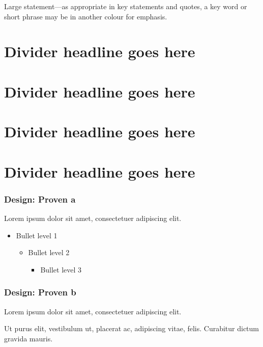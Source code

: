 \documentclass{ltx-talk-au}
\begin{document}
\begin{frame}[design=statement]
  Large statement—as appropriate in key statements and quotes, a key word or
  short phrase may be in another colour for \alert{emphasis}.
\end{frame}

\section{Divider headline goes here}

\section[theme=darkblue]{Divider headline goes here}

\section[theme=limestone]{Divider headline goes here}

\section[theme=purple]{Divider headline goes here}

\begin{frame}[design=proven a, theme=limestone]
  \frametitle{Design: Proven a}

  Lorem ipsum dolor sit amet, consectetuer adipiscing elit.

  \begin{itemize}
    \item Bullet level 1
      \begin{itemize}
        \item Bullet level 2
          \begin{itemize}
            \item Bullet level 3
          \end{itemize}
      \end{itemize}
  \end{itemize}


\end{frame}

\begin{frame}[design=proven b]
  \frametitle{Design: Proven b}

  Lorem ipsum dolor sit amet, consectetuer adipiscing elit.

  Ut purus elit, vestibulum ut, placerat ac, adipiscing vitae, felis.
  Curabitur dictum gravida mauris.
\end{frame}
\end{document}
